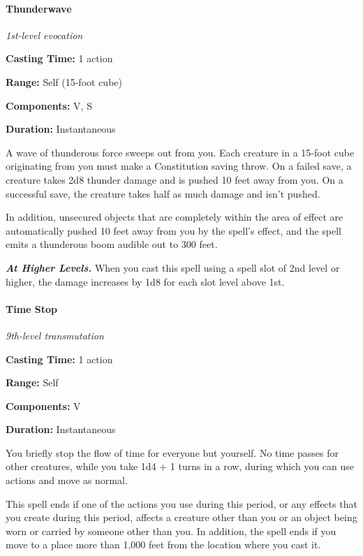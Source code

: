 \documentclass[
]{article}
\begin{document}
\hypertarget{thunderwave}{%
\paragraph{Thunderwave}\label{thunderwave}}

\emph{1st-level evocation}

\textbf{Casting Time:} 1 action

\textbf{Range:} Self (15-foot cube)

\textbf{Components:} V, S

\textbf{Duration:} Instantaneous

A wave of thunderous force sweeps out from you. Each creature in a
15-foot cube originating from you must make a Constitution saving throw.
On a failed save, a creature takes 2d8 thunder damage and is pushed 10
feet away from you. On a successful save, the creature takes half as
much damage and isn't pushed.

In addition, unsecured objects that are completely within the area of
effect are automatically pushed 10 feet away from you by the spell's
effect, and the spell emits a thunderous boom audible out to 300 feet.

\emph{\textbf{At Higher Levels.}} When you cast this spell using a spell
slot of 2nd level or higher, the damage increases by 1d8 for each slot
level above 1st.

\hypertarget{time-stop}{%
\paragraph{Time Stop}\label{time-stop}}

\emph{9th-level transmutation}

\textbf{Casting Time:} 1 action

\textbf{Range:} Self

\textbf{Components:} V

\textbf{Duration:} Instantaneous

You briefly stop the flow of time for everyone but yourself. No time
passes for other creatures, while you take 1d4 + 1 turns in a row,
during which you can use actions and move as normal.

This spell ends if one of the actions you use during this period, or any
effects that you create during this period, affects a creature other
than you or an object being worn or carried by someone other than you.
In addition, the spell ends if you move to a place more than 1,000 feet
from the location where you cast it.
\end{document}
